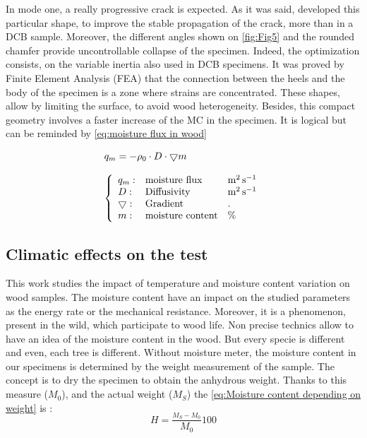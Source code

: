 In mode one, a really progressive crack is expected. As it was said, \parencite{Reference6} developed this particular shape, to improve the stable propagation of the crack, more than in a DCB sample. Moreover, the different angles shown on \ref{fig:Fig5} and the rounded chamfer provide uncontrollable collapse of the specimen. Indeed, the optimization consists, on the variable inertia also used in DCB specimens. It was proved by Finite Element Analysis (FEA) that the connection between the heels and the body of the specimen is a zone where strains are concentrated. These shapes, allow by limiting the surface, to avoid wood heterogeneity. Besides, this compact geometry involves a faster increase of the MC in the specimen. It is logical but can be reminded by \ref{eq:moisture flux in wood}

\begin{equation}
\begin{array}{l}
	q_{m}= -\rho_{0}\cdot D \cdot \bigtriangledown m 
	\\
	\\
	\left\{
	\begin{array}{lll}
	q_{m}: & $moisture flux$ & \si{\square\meter\per\second} \\
	D: & $Diffusivity$ & \si{\square\meter\per\second} \\
	\bigtriangledown: & $Gradient$ & . \\ 
	m: & $moisture content$ & \% \\
	\end{array}{}
	\right.
\end{array}{}
	\label{eq:moisture flux in wood}
\end{equation} 


\subsection{ Climatic effects on the test }

This work studies the impact of temperature and moisture content variation on wood samples. The moisture content have an impact on the studied parameters as the energy rate or the mechanical resistance. Moreover, it is a phenomenon, present in the wild, which participate to wood life. Non precise technics allow to have an idea of the moisture content in the wood. But every specie is different and even, each tree is different. 
Without moisture meter, the moisture content in our specimens is determined by the weight measurement of the sample. The concept is to dry the specimen to obtain the anhydrous weight. Thanks to this measure ($M_{0}$), and the actual weight ($M_{S}$) the \ref{eq:Moisture content depending on weight} is :
\begin{equation}
	H=\frac{_{M_{S}-M_{0}}}{M_{0}}100
	\label{eq:Moisture content depending on weight}
\end{equation} 

